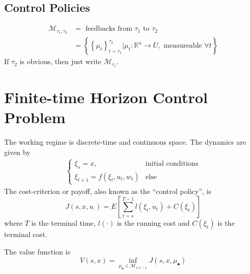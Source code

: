 \subsection{Control Policies}
\begin{align*}
\mathcal{M}_{\tau_1,\tau_2} &= \text{ feedbacks from } \tau_1 \text{ to } \tau_2 \\
&= \left\lbrace\left\lbrace\mu_t\right\rbrace_{t=\tau_1}^{\tau_2} | \mu_t: \mathbb{R}^n \to U, \text{ measureable } \forall t\right\rbrace
\end{align*}
If $\tau_2$ is obvious, then just write $\mathcal{M}_{\tau_1}$.

\section{Finite-time Horizon Control Problem}
The working regime is discrete-time and continuous space. The dynamics are given by
\begin{align*}
\begin{cases}
\xi_s = x, & \text{initial conditions} \\
\xi_{t+1} = f(\xi_t,u_t,w_t) & \text{else}
\end{cases}
\end{align*}
The cost-criterion or payoff, also known as the ``control policy'', is
$$J(s,x,u_\cdot) = E\left[\sum_{t=s}^{T-1} l(\xi_t,u_t) + C(\xi_t)\right]$$
where $T$ is the terminal time, $l(\cdot)$ is the running cost and $C(\xi_t)$ is the terminal cost.

The value function is
$$V(s,x) = \inf_{\mu_\bullet\in\mathcal{M}_{s,t-1}}J(s,x,\mu_\bullet)$$

